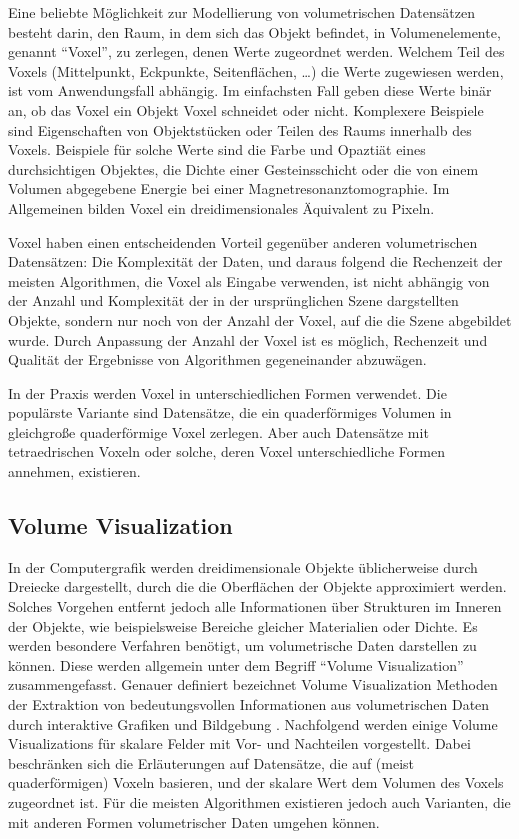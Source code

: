\documentclass[a4paper,fontsize=12pt,toc=bib,halfparskip]{scrartcl}
\begin{document}
Eine beliebte M\"oglichkeit zur Modellierung von volumetrischen Datens\"atzen besteht darin, den Raum, in dem sich das Objekt befindet, in Volumenelemente, genannt ``Voxel'', zu zerlegen, denen Werte zugeordnet werden. Welchem Teil des Voxels (Mittelpunkt, Eckpunkte, Seitenfl\"achen, \dots) die Werte zugewiesen werden, ist vom Anwendungsfall abh\"angig. Im einfachsten Fall geben diese Werte bin\"ar an, ob das Voxel ein Objekt Voxel schneidet oder nicht. Komplexere Beispiele sind Eigenschaften von Objektst\"ucken oder Teilen des Raums innerhalb des Voxels. Beispiele f\"ur solche Werte sind die Farbe und Opazti\"at eines durchsichtigen Objektes, die Dichte einer Gesteinsschicht oder die von einem Volumen abgegebene Energie bei einer Magnetresonanztomographie. Im Allgemeinen bilden Voxel ein dreidimensionales \"Aquivalent zu Pixeln.

Voxel haben einen entscheidenden Vorteil gegen\"uber anderen volumetrischen Datens\"atzen: Die Komplexit\"at der Daten, und daraus folgend die Rechenzeit der meisten Algorithmen, die Voxel als Eingabe verwenden, ist nicht abh\"angig von der Anzahl und Komplexit\"at der in der urspr\"unglichen Szene dargstellten Objekte, sondern  nur noch von der Anzahl der Voxel, auf die die Szene abgebildet wurde. Durch Anpassung der Anzahl der Voxel ist es m\"oglich, Rechenzeit und Qualit\"at der Ergebnisse von Algorithmen gegeneinander abzuw\"agen.

In der Praxis werden Voxel in unterschiedlichen Formen verwendet. Die popul\"arste Variante sind Datens\"atze, die ein quaderf\"ormiges Volumen in gleichgro{\ss}e quaderf\"ormige Voxel zerlegen. Aber auch Datens\"atze mit tetraedrischen Voxeln oder solche, deren Voxel unterschiedliche Formen annehmen, existieren. 

\subsection{Volume Visualization}
In der Computergrafik werden dreidimensionale Objekte \"ublicherweise durch Dreiecke dargestellt, durch die die Oberfl\"achen der Objekte approximiert werden. Solches Vorgehen entfernt jedoch alle Informationen \"uber Strukturen im Inneren der Objekte, wie beispielsweise Bereiche gleicher Materialien oder Dichte. Es werden besondere Verfahren ben\"otigt, um volumetrische Daten darstellen zu k\"onnen. Diese werden allgemein unter dem Begriff ``Volume Visualization'' zusammengefasst. Genauer definiert bezeichnet Volume Visualization Methoden der Extraktion von bedeutungsvollen Informationen aus volumetrischen Daten durch interaktive Grafiken und Bildgebung \cite[S.~127]{hansen2005visualization}. Nachfolgend werden einige Volume Visualizations f\"ur skalare Felder  mit Vor- und Nachteilen vorgestellt. Dabei beschr\"anken sich die Erl\"auterungen auf Datens\"atze, die auf (meist quaderf\"ormigen) Voxeln basieren, und der skalare Wert dem Volumen des Voxels zugeordnet ist. F\"ur die meisten Algorithmen existieren jedoch auch Varianten, die mit anderen Formen volumetrischer Daten umgehen k\"onnen.
\end{document}
